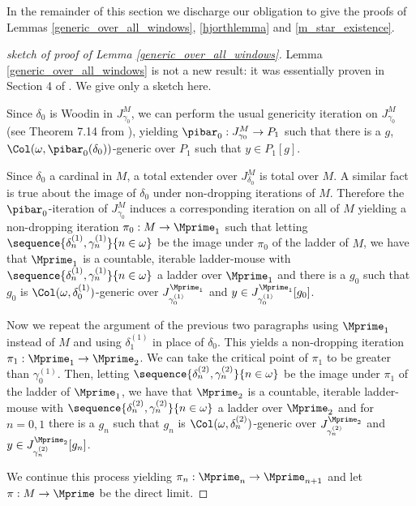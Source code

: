 \documentclass[oneside,12pt]{amsart}
\begin{document}
In the remainder of this section we discharge our obligation to give the proofs of
Lemmas \ref{generic_over_all_windows}, \ref{hjorthlemma} and
\ref{m_star_existence}.

\begin{proof}[sketch of proof of Lemma \ref{generic_over_all_windows}]
Lemma \ref{generic_over_all_windows} is not a new result: it was essentially
proven in Section 4 of \cite{Mouse_Sets}. We give only a sketch here.

Since $\delta_0$ is Woodin in $J^M_{\gamma_0}$,
we can perform the usual genericity iteration on $J^M_{\gamma_0}$
(see Theorem 7.14 from \cite{OutlineOfInnerModelTheory}), yielding
$\pibar_0:J^M_{\gamma_0}\to P_1$ such that
there is a $g$, $\Col(\omega,\pibar_0(\delta_0))$-generic over $P_1$ such that $y\in P_1[g]$.

Since $\delta_0$ a cardinal in $M$, a total extender over $J^M_{\delta_0}$ is total
over $M$. A similar fact is true about the image of $\delta_0$ under non-dropping
iterations of $M$.
Therefore the $\pibar_0$-iteration of $J^M_{\gamma_0}$ induces a corresponding iteration on all of $M$
yielding a non-dropping iteration $\pi_0:M\to \Mprime_1$ such that
letting $\sequence{\delta^{(1)}_n,\gamma^{(1)}_n}{n\in\omega}$ be the image under $\pi_0$
of the ladder of $M$, we have that $\Mprime_1$ is a countable, iterable ladder-mouse
with $\sequence{\delta^{(1)}_n,\gamma^{(1)}_n}{n\in\omega}$ a ladder over $\Mprime_1$
and there is a $g_0$ such that $g_0$
is $\Col(\omega,\delta^{(1)}_0)$-generic over
$J^{\Mprime_1}_{\gamma^{(1)}_0}$ and $y\in J^{\Mprime_1}_{\gamma^{(1)}_0}[g_0]$.

Now we repeat the argument of the previous two paragraphs using $\Mprime_1$ instead of $M$
and using $\delta^{(1)}_1$ in place of $\delta_0$. This yields a non-dropping iteration
$\pi_1:\Mprime_1\to\Mprime_2$. We can take the critical point of $\pi_1$ to be
greater than $\gamma^{(1)}_0$. Then,
letting $\sequence{\delta^{(2)}_n,\gamma^{(2)}_n}{n\in\omega}$ be the image under $\pi_1$
of the ladder of $\Mprime_1$, we have that $\Mprime_2$ is a countable, iterable ladder-mouse
with $\sequence{\delta^{(2)}_n,\gamma^{(2)}_n}{n\in\omega}$ a ladder over $\Mprime_2$
and for $n=0,1$ there is a $g_n$ such that $g_n$
is $\Col(\omega,\delta^{(2)}_n)$-generic over
$J^{\Mprime_2}_{\gamma^{(2)}_n}$ and $y\in J^{\Mprime_2}_{\gamma^{(2)}_n}[g_n]$.

We continue this process yielding $\pi_n:\Mprime_n\to\Mprime_{n+1}$ and
let $\pi:M\to\Mprime$ be the direct limit.

\end{proof}
\end{document}
